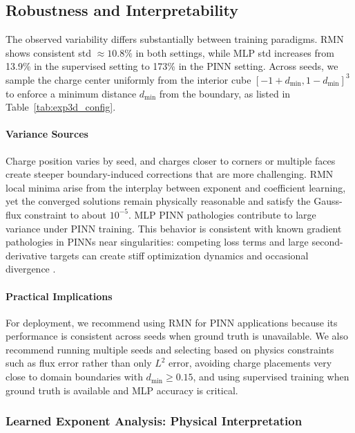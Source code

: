 \documentclass[twoside,11pt]{article}
\begin{document}
\subsection{Robustness and Interpretability}
\label{sec:variance_analysis}

The observed variability differs substantially between training paradigms. RMN shows consistent std $\approx 10.8\%$ in both settings, while MLP std increases from 13.9\% in the supervised setting to 173\% in the PINN setting. Across seeds, we sample the charge center uniformly from the interior cube $[-1 + d_{\min}, 1 - d_{\min}]^3$ to enforce a minimum distance $d_{\min}$ from the boundary, as listed in Table~\ref{tab:exp3d_config}.

\paragraph{Variance Sources} Charge position varies by seed, and charges closer to corners or multiple faces create steeper boundary-induced corrections that are more challenging. RMN local minima arise from the interplay between exponent and coefficient learning, yet the converged solutions remain physically reasonable and satisfy the Gauss-flux constraint to about $10^{-5}$. MLP PINN pathologies contribute to large variance under PINN training. This behavior is consistent with known gradient pathologies in PINNs near singularities: competing loss terms and large second-derivative targets can create stiff optimization dynamics and occasional divergence \citep{wang2021understanding}.

\paragraph{Practical Implications} For deployment, we recommend using RMN for PINN applications because its performance is consistent across seeds when ground truth is unavailable. We also recommend running multiple seeds and selecting based on physics constraints such as flux error rather than only $L^2$ error, avoiding charge placements very close to domain boundaries with $d_{\min} \geq 0.15$, and using supervised training when ground truth is available and MLP accuracy is critical.

\subsubsection{Learned Exponent Analysis: Physical Interpretation}
\label{sec:exponent_analysis}
\end{document}
